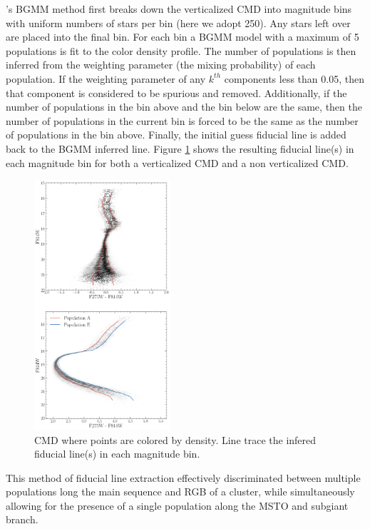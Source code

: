 \fidanka's BGMM method first breaks down the verticalized CMD into magnitude
bins with uniform numbers of stars per bin (here we adopt 250). Any stars left
over are placed into the final bin. For each bin a BGMM model with a maximum of
5 populations is fit to the color density profile. The number of populations is
then inferred from the weighting parameter (the mixing probability) of each
population. If the weighting parameter of any $k^{th}$ components less than
{\color{blue}0.05}, then that component is considered to be spurious and
removed. Additionally, if the number of populations in the bin above and the
bin below are the same, then the number of populations in the current bin is
forced to be the same as the number of populations in the bin above. Finally,
the initial guess fiducial line is added back to the BGMM inferred line. Figure
\ref{fig:vertFit} shows the resulting fiducial line(s) in each magnitude bin
for both a verticalized CMD and a non verticalized CMD.

\begin{figure}
	\centering
	\includegraphics[width=0.45\textwidth]{Notebooks/Figures/vertFit.png}
	\caption{CMD where points are colored by density. Line trace the infered 
	fiducial line(s) in each magnitude bin.}
	\label{fig:vertFit}
\end{figure}

This method of fiducial line extraction effectively discriminated between
multiple populations long the main sequence and RGB of a cluster, while
simultaneously allowing for the presence of a single population along the MSTO
and subgiant branch. 

